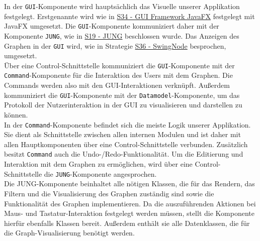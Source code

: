 \documentclass[enabledeprecatedfontcommands,fontsize=11pt,paper=a4,twoside]{scrartcl}
\newcounter{one}
\begin{document}
	In der \texttt{GUI}-Komponente wird hauptsächlich das Visuelle unserer Applikation festgelegt. Erstgenannte wird wie in \hyperlink{kkk}{S34 - GUI Framework JavaFX} festgelegt mit JavaFX umgesetzt. 
	Die \texttt{GUI}-Komponente kommuniziert daher mit der Komponente \texttt{JUNG}, wie in \hyperlink{eee}{S19 - JUNG} beschlossen wurde.
	Das Anzeigen des Graphen in der \texttt{GUI} wird, wie in Strategie \hyperlink{lll}{S36 - SwingNode} besprochen, umgesetzt. \\
	
	Über eine Control-Schnittstelle kommuniziert die \texttt{GUI}-Komponente mit der \texttt{Command}-Komponente für die Interaktion des Users mit dem Graphen. Die Commands werden also mit den GUI-Interaktionen verknüpft.
	Außerdem kommuniziert die \texttt{GUI}-Komponente mit der \texttt{Datamodel}-Komponente, um das Protokoll der Nutzerinteraktion in der GUI zu visualisieren und darstellen zu können. \\
	
	In der \texttt{Command}-Komponente befindet sich die meiste Logik unserer Applikation. Sie dient als Schnittstelle zwischen allen internen Modulen und ist daher mit allen Hauptkomponenten über eine Control-Schnittstelle verbunden. Zusätzlich besitzt \texttt{Command} auch die Undo-/Redo-Funktionalität. Um die Editierung und Interaktion mit dem Graphen zu ermöglichen, wird über eine Control-Schnittstelle die \texttt{JUNG}-Komponente angesprochen. \\
	
	Die {JUNG}-Komponente beinhaltet alle nötigen Klassen, die für das Rendern, das Filtern und die Visualisierung des Graphen zuständig sind sowie die Funktionalität des Graphen implementieren. Da die auszuführenden Aktionen bei Maus- und Tastatur-Interaktion festgelegt werden müssen, stellt die Komponente hierfür ebenfalls Klassen bereit. Außerdem enthält sie alle Datenklassen, die für die Graph-Visualisierung benötigt werden. \\
	
\end{document}
